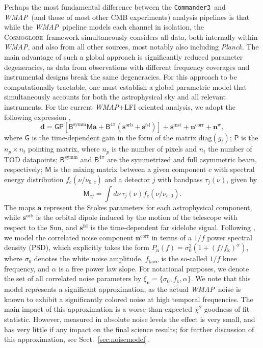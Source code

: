 \documentclass[twocolumn]{../../common/aa}
\def\WMAP{\emph{WMAP}}
\def\Planck{\emph{Planck}}
\def\commanderthree{\texttt{Commander3}}
\newcommand{\cosmoglobe}{\textsc{Cosmoglobe}}
\begin{document}
Perhaps the most fundamental difference between the \commanderthree\ and \WMAP\ (and those of most other CMB experiments) analysis pipelines is that while the \WMAP\ pipeline models each channel in isolation, the \cosmoglobe\ framework simultaneously considers all data, both internally within \WMAP, and also from all other sources, most notably also including \Planck. The main advantage of such a global approach is significantly reduced parameter degeneracies, as data from observations with different frequency coverages and instrumental designs break the same degeneracies. For this approach to be computationally tractable, one must establish a global parametric model that simultaneously accounts for both the astrophysical sky and all relevant instruments. For the current \WMAP+LFI oriented analysis, we adopt the following expression \citep{bp01},
\begin{equation}
	\label{eq:model}
	\boldsymbol d =\mathsf G\mathsf P[\mathsf B^\mathrm{symm}\mathsf M\boldsymbol a+\mathsf B^\mathrm{4\pi}(\boldsymbol s^\mathrm{orb}
	+\boldsymbol s^\mathrm{fsl})] + \boldsymbol s^\mathrm{inst}+ \boldsymbol n^\mathrm{corr}+\boldsymbol n^\mathrm w,
\end{equation}
where $\mathsf G$ is the time-dependent gain in the form of the matrix $\mathrm{diag}(g_t)$; $\mathsf P$ is the $n_p\times n_t$ pointing matrix, where $n_p$ is the number of pixels and $n_t$ the number of TOD datapoints;
$\mathsf B^\mathrm{symm}$ and $\mathsf B^{4\pi}$ are the symmetrized and full asymmetric beam, respectively; $\mathsf M$ is the mixing matrix between a given component $c$ with spectral energy distribution $f_c(\nu/\nu_{0,c})$ and a detector $j$ with bandpass $\tau_j(\nu)$, given by
\begin{equation}
	\mathsf M_{cj}=\int d\nu\,\tau_j(\nu)f_c(\nu/\nu_{c,0}).
\end{equation}
The maps $\boldsymbol a$ represent the Stokes parameters for each astrophysical component, while $\boldsymbol s^\mathrm{orb}$ is the orbital dipole induced by the motion of the telescope with respect to the Sun, and $\boldsymbol s^\mathrm{fsl}$ is the time-dependent far sidelobe signal. Following \citet{bp06}, we model the correlated noise component $\boldsymbol n^\mathrm{corr}$ in terms of a $1/f$ power spectral density (PSD), which explicitly takes the form $P_\mathrm{n}(f) = \sigma^2_0 (1 + (f/f_\mathrm{k})^\alpha)$, where $\sigma_0$ denotes the white noise amplitude, $f_\mathrm{knee}$ is the so-called $1/f$ knee frequency, and $\alpha$ is a free power law slope. For notational purposes, we denote the set of all correlated noise parameters by $\xi_{\mathrm{n}} = \{\sigma_0, f_{\mathrm{k}}, \alpha\}$. We note that this model represents a significant approximation, as the actual \WMAP\ noise is known to exhibit a significantly colored noise at high temporal frequencies. The main impact of this approximation is a worse-than-expected $\chi^2$ goodness of fit statistic. However, measured in absolute noise levels the effect is very small, and has very little if any impact on the final science results; for further discussion of this approximation, see Sect.~\ref{sec:noisemodel}. 
\end{document}
